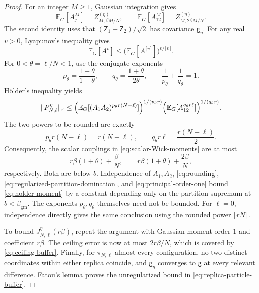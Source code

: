 \documentclass[11pt,reqno]{amsart}
\numberwithin{equation}{section}
\theoremstyle{plain}
\theoremstyle{definition}
\newcommand{\E}{\mathbb E}
\newcommand{\be}{\beta}
\newcommand{\g}{\mathsf g}
\newcommand{\gm}{\mathrm{gm}}
\begin{document}
\begin{proof}
For an integer $M\geq1$, Gaussian integration gives
\begin{equation}\label{eq:scalar-Wick-moments}
 \E_G[A_j^M]=Z_{M,\be M/N}^{(\eta)},\qquad
 \E_G[A_{12}^M]=Z_{M,2\be M/N}^{(\eta)}.
\end{equation}
The second identity uses that $(\mathsf Z_1+\mathsf Z_2)/\sqrt2$ has covariance $\g_\eta$.  For any real $v>0$, Lyapunov's inequality gives
\begin{equation}\label{eq:rounding}
 \E_G[A^v]\leq\bigl(\E_G[A^{\lceil v\rceil}]\bigr)^{v/\lceil v\rceil}.
\end{equation}
For $0<\theta=\ell/N<1$, use the conjugate exponents
\begin{equation}\label{eq:replica-holder}
 p_\theta=\frac{1+\theta}{1-\theta},\qquad
 q_\theta=\frac{1+\theta}{2\theta},\qquad
 \frac1{p_\theta}+\frac1{q_\theta}=1.
\end{equation}
H\"older's inequality yields
\begin{equation}\label{eq:holder-moment}
 \|P_{N,\ell}^{\eta}\|_r
 \leq\Bigl(\E_G[(A_1A_2)^{p_\theta r(N-\ell)}]\Bigr)^{1/(p_\theta r)}
 \Bigl(\E_G[A_{12}^{q_\theta r\ell}]\Bigr)^{1/(q_\theta r)}.
\end{equation}
The two powers to be rounded are exactly
\begin{equation}\label{eq:balanced-powers}
 p_\theta r(N-\ell)=r(N+\ell),\qquad
 q_\theta r\ell=\frac{r(N+\ell)}2.
\end{equation}
Consequently, the scalar couplings in \eqref{eq:scalar-Wick-moments} are at most
\begin{equation}\label{eq:effective-coupling}
 r\be(1+\theta)+\frac{\be}{N},\qquad
 r\be(1+\theta)+\frac{2\be}{N},
\end{equation}
respectively.  Both are below $b$.  Independence of $A_1,A_2$, \eqref{eq:rounding}, \eqref{eq:regularized-partition-domination}, and \eqref{eq:principal-order-one} bound \eqref{eq:holder-moment} by a constant depending only on the partition supremum at $b<\beta_{\gm}$.  The exponents $p_\theta,q_\theta$ themselves need not be bounded.  For $\ell=0$, independence directly gives the same conclusion using the rounded power $\lceil rN\rceil$.

To bound $J_{N,\ell}^{\eta}(r\be)$, repeat the argument with Gaussian moment order $1$ and coefficient $r\be$.  The ceiling error is now at most $2r\be/N$, which is covered by \eqref{eq:ceiling-buffer}.  Finally, for $\pi_{N,\ell}$-almost every configuration, no two distinct coordinates within either replica coincide, and $\g_\eta$ converges to $\g$ at every relevant difference.  Fatou's lemma proves the unregularized bound in \eqref{eq:replica-particle-buffer}.
\end{proof}
\end{document}
